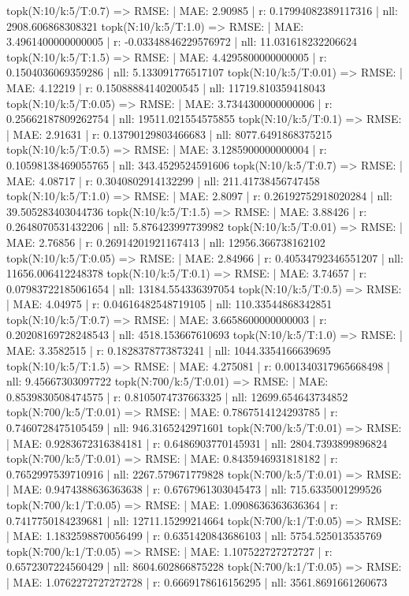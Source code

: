topk(N:10/k:5/T:0.7) => RMSE: | MAE: 2.90985 | r: 0.17994082389117316 | nll: 2908.606868308321
topk(N:10/k:5/T:1.0) => RMSE: | MAE: 3.4961400000000005 | r: -0.03348846229576972 | nll: 11.031618232206624
topk(N:10/k:5/T:1.5) => RMSE: | MAE: 4.4295800000000005 | r: 0.1504036069359286 | nll: 5.133091776517107
topk(N:10/k:5/T:0.01) => RMSE: | MAE: 4.12219 | r: 0.15088884140200545 | nll: 11719.810359418043
topk(N:10/k:5/T:0.05) => RMSE: | MAE: 3.7344300000000006 | r: 0.25662187809262754 | nll: 19511.021554575855
topk(N:10/k:5/T:0.1) => RMSE: | MAE: 2.91631 | r: 0.13790129803466683 | nll: 8077.6491868375215
topk(N:10/k:5/T:0.5) => RMSE: | MAE: 3.1285900000000004 | r: 0.10598138469055765 | nll: 343.4529524591606
topk(N:10/k:5/T:0.7) => RMSE: | MAE: 4.08717 | r: 0.3040802914132299 | nll: 211.41738456747458
topk(N:10/k:5/T:1.0) => RMSE: | MAE: 2.8097 | r: 0.26192752918020284 | nll: 39.505283403044736
topk(N:10/k:5/T:1.5) => RMSE: | MAE: 3.88426 | r: 0.2648070531432206 | nll: 5.876423997739982
topk(N:10/k:5/T:0.01) => RMSE: | MAE: 2.76856 | r: 0.26914201921167413 | nll: 12956.366738162102
topk(N:10/k:5/T:0.05) => RMSE: | MAE: 2.84966 | r: 0.40534792346551207 | nll: 11656.006412248378
topk(N:10/k:5/T:0.1) => RMSE: | MAE: 3.74657 | r: 0.07983722185061654 | nll: 13184.554336397054
topk(N:10/k:5/T:0.5) => RMSE: | MAE: 4.04975 | r: 0.04616482548719105 | nll: 110.33544868342851
topk(N:10/k:5/T:0.7) => RMSE: | MAE: 3.6658600000000003 | r: 0.20208169728248543 | nll: 4518.153667610693
topk(N:10/k:5/T:1.0) => RMSE: | MAE: 3.3582515 | r: 0.1828378773873241 | nll: 1044.3354166639695
topk(N:10/k:5/T:1.5) => RMSE: | MAE: 4.275081 | r: 0.001340317965668498 | nll: 9.45667303097722
topk(N:700/k:5/T:0.01) => RMSE: | MAE: 0.8539830508474575 | r: 0.8105074737663325 | nll: 12699.654643734852
topk(N:700/k:5/T:0.01) => RMSE: | MAE: 0.7867514124293785 | r: 0.7460728475105459 | nll: 946.3165242971601
topk(N:700/k:5/T:0.01) => RMSE: | MAE: 0.9283672316384181 | r: 0.6486903770145931 | nll: 2804.7393899896824
topk(N:700/k:5/T:0.01) => RMSE: | MAE: 0.8435946931818182 | r: 0.7652997539710916 | nll: 2267.579671779828
topk(N:700/k:5/T:0.01) => RMSE: | MAE: 0.9474388636363638 | r: 0.6767961303045473 | nll: 715.6335001299526
topk(N:700/k:1/T:0.05) => RMSE: | MAE: 1.0908636363636364 | r: 0.7417750184239681 | nll: 12711.15299214664
topk(N:700/k:1/T:0.05) => RMSE: | MAE: 1.1832598870056499 | r: 0.6351420843686103 | nll: 5754.525013535769
topk(N:700/k:1/T:0.05) => RMSE: | MAE: 1.107522727272727 | r: 0.6572307224560429 | nll: 8604.602866875228
topk(N:700/k:1/T:0.05) => RMSE: | MAE: 1.0762272727272728 | r: 0.6669178616156295 | nll: 3561.8691661260673
